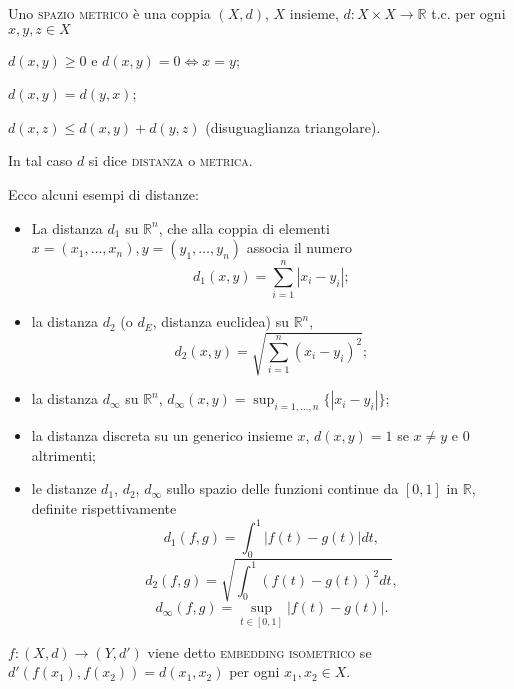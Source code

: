 \begin{defn}
	Uno \textsc{spazio metrico} è una coppia $(X, d)$, $X$ insieme,
	${d: X \times X \rightarrow \mathbb{R}}$ t.c. per ogni ${x, y, z \in X}$
    \begin{nlist}
    	\item $d(x, y) \ge 0$ e $d(x, y)=0 \Leftrightarrow x=y$;
    	\item $d(x, y)=d(y, x)$;
    	\item $d(x, z) \le d(x, y)+d(y,z)$ (disuguaglianza triangolare).
    \end{nlist}
	In tal caso $d$ si dice \textsc{distanza} o \textsc{metrica}.
\end{defn}

\begin{ex}
    Ecco alcuni esempi di distanze:
    \begin{itemize}
        \item La distanza $d_1$ su $\mathbb{R}^n$, che alla coppia di elementi
        ${x=(x_1, \dots, x_n)}, {y=(y_1, \dots, y_n)}$ associa il numero
        $${\displaystyle d_1(x, y)=\sum_{i=1}^n |x_i-y_i|};$$
        \item la distanza $d_2$ (o $d_E$, distanza euclidea) su $\mathbb{R}^n$,
        $$\displaystyle d_2(x, y)=\sqrt{\sum_{i=1}^n (x_i-y_i)^2};$$
        \item la distanza $d_{\infty}$ su $\mathbb{R}^n$, ${\displaystyle
        d_{\infty}(x, y)=\sup_{i=1, \dots, n} \{ |x_i-y_i| \}}$;
        \item
        la distanza discreta su un generico insieme $x$, $d(x, y)=1$ se $x \not=
        y$ e $0$ altrimenti;
        \item le distanze $d_1$, $d_2$, $d_{\infty}$ sullo spazio delle funzioni
        continue da $[0, 1]$ in $\mathbb{R}$, definite rispettivamente
        $${\displaystyle d_1(f, g)=\int_0^1 |f(t)-g(t)| dt},$$
        $${\displaystyle d_2(f, g)=\sqrt{\int_0^1 (f(t)-g(t))^2 dt}},$$
        $${\displaystyle d_{\infty}(f, g)=\sup_{t \in [0, 1]} |f(t)-g(t)|}.$$
    \end{itemize}
\end{ex}

\begin{defn}
	$f:(X, d) \rightarrow (Y, d')$ viene detto \textsc{embedding isometrico} se
	$d'(f(x_1), f(x_2))=d(x_1, x_2)$ per ogni $x_1, x_2 \in X$.
\end{defn}

